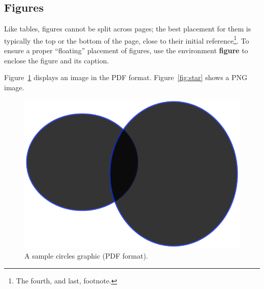 \documentclass[sigconf]{acmart}
\begin{document}
\subsection{Figures}

Like tables, figures cannot be split across pages; the best placement for them
is typically the top or the bottom of the page, close to their initial
reference\footnote{The fourth, and last, footnote.}.  To ensure a proper
``floating'' placement of figures, use the environment \textbf{figure} to
enclose the figure and its caption.

Figure~\ref{fig:circles} displays an image in the PDF format.
Figure~\ref{fig:star} shows a PNG image.

\begin{figure}
    \centering
    \includegraphics[scale=0.5]{circles.pdf}
    \caption{A sample circles graphic (PDF format).}
    \label{fig:circles}
\end{figure}
\end{document}
